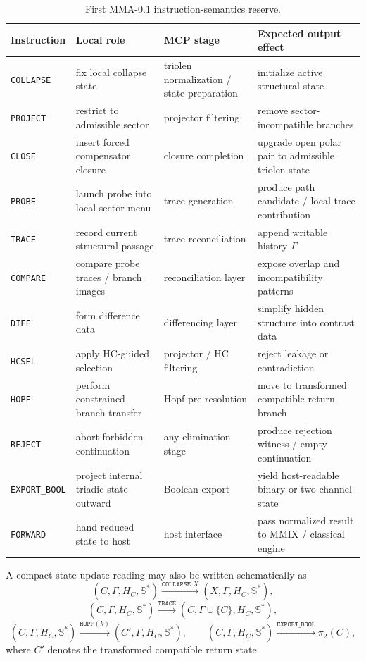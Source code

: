 \begin{table}[h]
\centering
\caption{First MMA-0.1 instruction-semantics reserve.}
\begin{tabular}{>{\raggedright\arraybackslash}p{} >{\raggedright\arraybackslash}p{} >{\raggedright\arraybackslash}p{} >{\raggedright\arraybackslash}p{}}
\toprule
Instruction & Local role & MCP stage & Expected output effect \\
\midrule
\texttt{COLLAPSE} & fix local collapse state & triolen normalization / state preparation & initialize active structural state \\
\texttt{PROJECT} & restrict to admissible sector & projector filtering & remove sector-incompatible branches \\
\texttt{CLOSE} & insert forced compensator closure & closure completion & upgrade open polar pair to admissible triolen state \\
\texttt{PROBE} & launch probe into local sector menu & trace generation & produce path candidate / local trace contribution \\
\texttt{TRACE} & record current structural passage & trace reconciliation & append writable history \(\Gamma\) \\
\texttt{COMPARE} & compare probe traces / branch images & reconciliation layer & expose overlap and incompatibility patterns \\
\texttt{DIFF} & form difference data & differencing layer & simplify hidden structure into contrast data \\
\texttt{HCSEL} & apply HC-guided selection & projector / HC filtering & reject leakage or contradiction \\
\texttt{HOPF} & perform constrained branch transfer & Hopf pre-resolution & move to transformed compatible return branch \\
\texttt{REJECT} & abort forbidden continuation & any elimination stage & produce rejection witness / empty continuation \\
\texttt{EXPORT\_BOOL} & project internal triadic state outward & Boolean export & yield host-readable binary or two-channel state \\
\texttt{FORWARD} & hand reduced state to host & host interface & pass normalized result to MMIX / classical engine \\
\bottomrule
\end{tabular}
\end{table}

A compact state-update reading may also be written schematically as
\[
(C,\Gamma,H_C,\mathbb S^\ast)
\xrightarrow{\texttt{COLLAPSE }X}
(X,\Gamma,H_C,\mathbb S^\ast),
\]
\[
(C,\Gamma,H_C,\mathbb S^\ast)
\xrightarrow{\texttt{TRACE}}
(C,\Gamma\cup\{C\},H_C,\mathbb S^\ast),
\]
\[
(C,\Gamma,H_C,\mathbb S^\ast)
\xrightarrow{\texttt{HOPF}(k)}
(C',\Gamma,H_C,\mathbb S^\ast),
\qquad
(C,\Gamma,H_C,\mathbb S^\ast)
\xrightarrow{\texttt{EXPORT\_BOOL}}
\pi_2(C),
\]
where \(C'\) denotes the transformed compatible return state.

